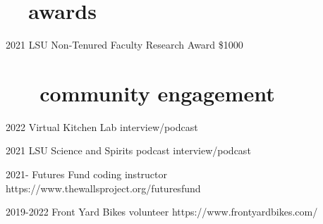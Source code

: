 \documentclass[]{CV}
\begin{document}
{%





\section{\faTrophy \ \ awards}
\begin{entrylist}


 \entry
 {2021}
 {LSU Non-Tenured Faculty Research Award}
 {\$1000}

\end{entrylist}











\section{ \faUserPlus \ \ \ community engagement}

\begin{entrylist}

 \entry
	 {2022}
	 {Virtual Kitchen Lab}
	 {interview/podcast}

 \entry
	 {2021}
	 {LSU Science and Spirits podcast}
	 {interview/podcast}
 
 \entry
	 {2021-}
	 {Futures Fund coding instructor}
	 {https://www.thewallsproject.org/futuresfund}

 \entry
	 {2019-2022}
	 {Front Yard Bikes volunteer}
	 {https://www.frontyardbikes.com/}

\end{entrylist}















}
\end{document}
